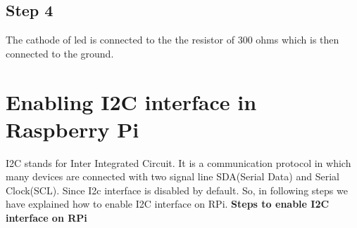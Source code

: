 \documentclass[a4paper,12pt,oneside]{book}
\begin{document}
\subsection*{Step 4}
The cathode of led is connected to the the resistor of 300 ohms which
is then connected to the ground.

\section{Enabling I2C interface in Raspberry Pi}
I2C stands for Inter Integrated Circuit. It is a communication protocol in which many devices are connected with two signal line SDA(Serial Data) and Serial Clock(SCL).
Since I2c interface is disabled by default. So, in following steps we have explained how to enable I2C interface on RPi. 
\textbf{Steps to enable I2C interface on RPi}
\end{document}
